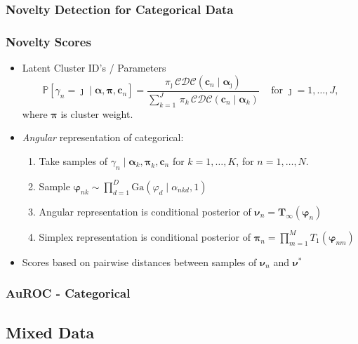 \documentclass[aspectratio=169,10pt]{beamer}
\begin{document}
\subsubsection{Novelty Detection for Categorical Data}

\begin{frame}
    \frametitle{Novelty Scores}
    \label{ndpg:noveltyscores}
    \begin{itemize}
    \item Latent Cluster ID's / Parameters
        \[
        \mathbb{P}[\gamma_n = \jmath\mid \bm{\alpha}, \bm{\pi}, \bm{c}_n] = 
        \frac{
            \pi_{\jmath}\,\mathcal{CDC}\left(\bm{c}_n\mid\bm{\alpha}_{\jmath}\right)
            }{
            \sum_{k = 1}^J\,\pi_k\,\mathcal{CDC}\left(\bm{c}_n\mid\bm{\alpha}_k\right)
            }
            \;\;\;\text{ for }\jmath = 1, \ldots, J,
        \]
    where $\bm{\pi}$ is cluster weight.
    \item \emph{Angular} representation of categorical:
        \begin{enumerate}
            \item Take samples of $\gamma_n\mid \bm{\alpha}_k,\bm{\pi}_k,\bm{c}_n$ for $k = 1,\ldots,K$, for $n = 1,\ldots, N$.
            \item Sample $\bm{\varphi}_{nk}\sim \prod_{d = 1}^D\text{Ga}(\varphi_d\mid\alpha_{nkd},1)$
            \item Angular representation is conditional posterior of $\bm{\nu}_n = \bm{T}_{\infty}(\bm{\varphi}_n)$
            \item Simplex representation is conditional posterior of $\bm{\pi}_n = \prod_{m = 1}^MT_1(\bm{\varphi}_{nm})$
        \end{enumerate}
    \item Scores based on pairwise distances between samples of $\bm{\nu}_n$ and $\bm{\nu}^*$
    \end{itemize}
    \hyperlink{ndpg:noveltyscoresdetail}{}
\end{frame} %

\begin{frame}
    \frametitle{AuROC - Categorical}
    \begin{table}
        \centering
        
    \end{table}
\end{frame} %

\subsection{Mixed Data}
\end{document}
